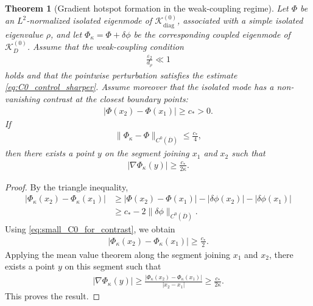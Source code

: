 \documentclass[10pt]{article}
\numberwithin{equation}{section}
\newtheorem{theorem}{Theorem}[section]
\begin{document}
\begin{theorem}[Gradient hotspot formation in the weak-coupling regime]
\label{thm:hotspot}
Let $\Phi$ be an $L^2$-normalized isolated eigenmode of $\mathcal K_{\mathrm{diag}}^{(0)}$, associated with a simple isolated eigenvalue $\rho$, and let $\Phi_\kappa=\Phi+\delta\phi$ be the corresponding coupled eigenmode of $\mathcal K_D^{(0)}$. Assume that the weak-coupling condition
\begin{align*}
    \frac{\varepsilon_2}{d_\rho}\ll1
\end{align*}
holds and that the pointwise perturbation satisfies the estimate \eqref{eq:C0_control_sharper}. Assume moreover that the isolated mode has a non-vanishing contrast at the closest boundary points:
\begin{align}
    |\Phi(x_2)-\Phi(x_1)|
    \geq
    c_*
    >
    0.
    \label{eq:isolated_boundary_contrast}
\end{align}
If
\begin{align}
    \|\Phi_\kappa-\Phi\|_{C^0(\overline D)}
    \leq
    \frac{c_*}{4},
    \label{eq:small_C0_for_contrast}
\end{align}
then there exists a point $y$ on the segment joining $x_1$ and $x_2$ such that
\begin{align}
    |\nabla \Phi_\kappa(y)|
    \geq
    \frac{c_*}{2\kappa}.
    \label{eq:gradient_hotspot_bound}
\end{align}
\end{theorem}

\begin{proof}
By the triangle inequality,
\begin{align*}
    |\Phi_\kappa(x_2)-\Phi_\kappa(x_1)|
    &\geq
    |\Phi(x_2)-\Phi(x_1)|
    -
    |\delta\phi(x_2)|
    -
    |\delta\phi(x_1)| \\
    &\geq
    c_*
    -
    2\|\delta\phi\|_{C^0(\overline D)}.
\end{align*}
Using \eqref{eq:small_C0_for_contrast}, we obtain
\begin{align*}
    |\Phi_\kappa(x_2)-\Phi_\kappa(x_1)|
    \geq
    \frac{c_*}{2}.
\end{align*}
Applying the mean value theorem along the segment joining $x_1$ and $x_2$, there exists a point $y$ on this segment such that
\begin{align*}
    |\nabla \Phi_\kappa(y)|
    \geq
    \frac{|\Phi_\kappa(x_2)-\Phi_\kappa(x_1)|}{|x_2-x_1|}
    \geq
    \frac{c_*}{2\kappa}.
\end{align*}
This proves the result.
\end{proof}
\end{document}
